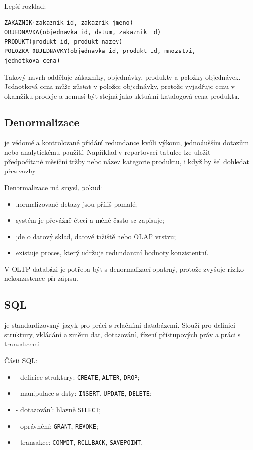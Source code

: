 Lepší rozklad:
{\small
\begin{verbatim}
ZAKAZNIK(zakaznik_id, zakaznik_jmeno)
OBJEDNAVKA(objednavka_id, datum, zakaznik_id)
PRODUKT(produkt_id, produkt_nazev)
POLOZKA_OBJEDNAVKY(objednavka_id, produkt_id, mnozstvi, jednotkova_cena)
\end{verbatim}
}

Takový návrh odděluje zákazníky, objednávky, produkty a položky objednávek. Jednotková cena může
zůstat v položce objednávky, protože vyjadřuje cenu v okamžiku prodeje a nemusí být stejná jako
aktuální katalogová cena produktu.

\subsection{Denormalizace}
 je vědomé a kontrolované přidání redundance kvůli výkonu, jednodušším dotazům
nebo analytickému použití. Například v reportovací tabulce lze uložit předpočítané měsíční tržby
nebo název kategorie produktu, i když by šel dohledat přes vazby.

Denormalizace má smysl, pokud:
\begin{itemize}
  \item normalizované dotazy jsou příliš pomalé;
  \item systém je převážně čtecí a méně často se zapisuje;
  \item jde o datový sklad, datové tržiště nebo OLAP vrstvu;
  \item existuje proces, který udržuje redundantní hodnoty konzistentní.
\end{itemize}

V OLTP databázi je potřeba být s denormalizací opatrný, protože zvyšuje riziko nekonzistence při
zápisu.

\subsection{SQL}
 je standardizovaný jazyk pro práci s relačními databázemi. Slouží pro definici struktury,
vkládání a změnu dat, dotazování, řízení přístupových práv a práci s transakcemi.

Části SQL:
\begin{itemize}
  \item {} - definice struktury: \texttt{CREATE}, \texttt{ALTER},
  \texttt{DROP};
  \item {} - manipulace s daty: \texttt{INSERT}, \texttt{UPDATE},
  \texttt{DELETE};
  \item {} - dotazování: hlavně \texttt{SELECT};
  \item {} - oprávnění: \texttt{GRANT}, \texttt{REVOKE};
  \item {} - transakce: \texttt{COMMIT}, \texttt{ROLLBACK},
  \texttt{SAVEPOINT}.
\end{itemize}

